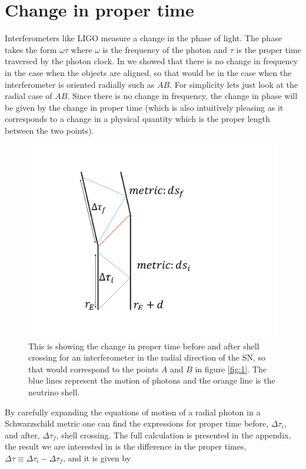 \documentclass[aps,showpacs,twocolumn,floats,prd,superscriptaddress,nofootinbib]{revtex4-1}
\begin{document}
\section{Change in proper time}
\label{Ptime}
Interferometers like LIGO measure a change in the phase of light. The phase takes the form $\omega \tau$ where $\omega$ is the frequency of the photon and $\tau$ is the proper time traversed by the photon clock. In \cite{Pulsar_acc} we showed that there is no change in frequency in the case when the objects are aligned, so that would be in the case when the interferometer is oriented radially such as $AB$. For simplicity lets just look at the radial case of $AB$. Since there is no change in frequency, the change in phase will be given by the change in proper time (which is also intuitively pleasing as it corresponds to a change in a physical quantity which is the proper length between the two points). 
\begin{figure}[h!]
\begin{center}
\includegraphics[scale = 0.4]{shellcrossing.pdf}
\caption{This is showing the change in proper time before and after shell crossing for an interferometer in the radial direction of the SN, so that would correspond to the points $A$ and $B$ in figure \ref{fig:1}. The blue lines represent the motion of photons and the orange line is the neutrino shell.}
\label{fig:2}
\end{center}
\end{figure}
By carefully expanding the equations of motion of a radial photon in a Schwarzschild metric one can find the expressions for proper time before, $\Delta \tau_i$, and after, $\Delta \tau_f$, shell crossing. The full calculation is presented in the appendix, the result we are interested in is the difference in the proper times, $\Delta \tau \equiv \Delta \tau_i - \Delta \tau_f$, and it is given by
\end{document}
